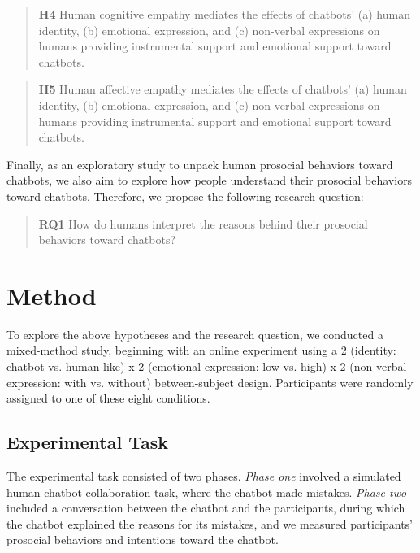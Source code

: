 \begin{quote}
\textbf{H4} Human cognitive empathy mediates the effects of chatbots' (a) human identity, (b) emotional expression, and (c) non-verbal expressions on humans providing instrumental support and emotional support toward chatbots.
\end{quote}
\begin{quote}
\textbf{H5} Human affective empathy mediates the effects of chatbots' (a) human identity, (b) emotional expression, and (c) non-verbal expressions on humans providing instrumental support and emotional support toward chatbots.
\end{quote}

Finally, as an exploratory study to unpack human prosocial behaviors toward chatbots, we also aim to explore how people understand their prosocial behaviors toward chatbots. Therefore, we propose the following research question:

\begin{quote}
\textbf{RQ1} How do humans interpret the reasons behind their prosocial behaviors toward chatbots?
\end{quote}

\section{Method}
To explore the above hypotheses and the research question, we conducted a mixed-method study, beginning with an online experiment using a 2 (identity: chatbot vs. human-like) x 2 (emotional expression: low vs. high) x 2 (non-verbal expression: with vs. without) between-subject design. Participants were randomly assigned to one of these eight conditions.

\subsection{Experimental Task}
The experimental task consisted of two phases. \textit{Phase one} involved a simulated human-chatbot collaboration task, where the chatbot made mistakes. \textit{Phase two} included a conversation between the chatbot and the participants, during which the chatbot explained the reasons for its mistakes, and we measured participants’ prosocial behaviors and intentions toward the chatbot. 

